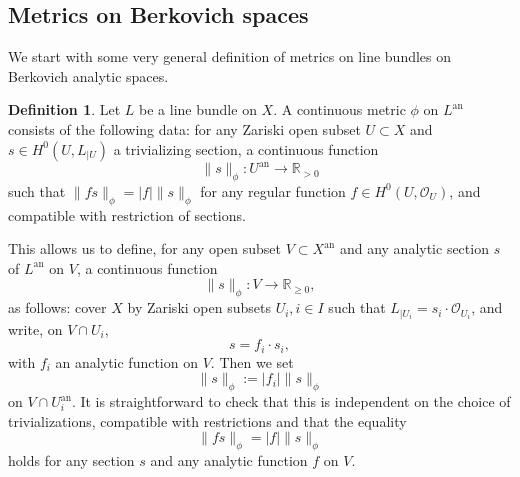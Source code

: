 \documentclass[JEP,XML,SOM,Unicode,published]{cedram}
\theoremstyle{definition}
\newtheorem{defn}[equation]{Definition}
\newcommand \R{\mathbb R}
\newcommand \gO {\mathcal O}
\newcommand{\an}{\mathrm{an}}
\begin{document}
\subsection{Metrics on Berkovich spaces}
We start with some very general definition of metrics on line bundles on Berkovich analytic spaces.
\begin{defn} Let $L$ be a line bundle on $X$. A continuous metric $\phi$ on $L^{\an}$ consists of the following data: for any Zariski open subset $U \subset X$ and $s \in H^0(U, L_{| U})$ a trivializing section, a continuous function\vspace*{-3pt}
\[
\lVert s \rVert_{\phi}: U^{\an} \to \R_{>0}
\]
such that $\lVert f s \rVert_{\phi} = \lvert f \rvert \lVert s \rVert_{\phi}$ for any regular function $f \in H^0(U, \gO_U)$, and compatible with restriction of sections.
\end{defn}
This allows us to define, for any open subset $V \subset X^{\an}$ and any analytic section $s$ of $L^{\an}$ on $V$, a continuous function\vspace*{-3pt}
\[
\lVert s \rVert_{\phi}: V \to \R_{\ge 0},
\]
as follows: cover $X$ by Zariski open subsets $U_i, i \in I$ such that $L_{| U_i} = s_i \cdot \gO_{U_i}$, and write, on $V \cap U_i$,\vspace*{-3pt}
\[
s= f_i \cdot s_i,
\]
with $f_i$ an analytic function on $V$. Then we set\vspace*{-3pt}
\[
\lVert s \rVert_{\phi}:= \lvert f_i \rvert \lVert s \rVert_{\phi}
\]
on $V \cap U^{\an}_i$. It is straightforward to check that this is independent on the choice of trivializations, compatible with restrictions and that the equality
\[
\lVert f s \rVert_{\phi} = \lvert f \rvert \lVert s \rVert_{\phi}
\]
holds for any section $s$ and any analytic function $f$ on $V$.
\end{document}
